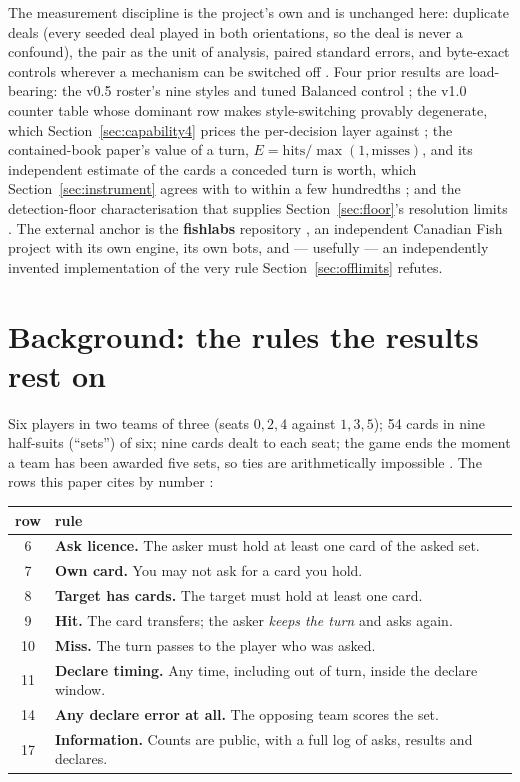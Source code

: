 \documentclass[11pt]{article}
\begin{document}
The measurement discipline is the project's own and is unchanged here: duplicate deals (every seeded
deal played in both orientations, so the deal is never a confound), the pair as the unit of
analysis, paired standard errors, and byte-exact controls wherever a mechanism can be switched off
\cite{v05paper,botlab}. Four prior results are load-bearing: the v0.5 roster's nine styles and tuned
Balanced control \cite{v05paper,styles}; the v1.0 counter table whose dominant row makes
style-switching provably degenerate, which Section~\ref{sec:capability4} prices the per-decision
layer against \cite{v10paper,v15paper,bounded}; the contained-book paper's value of a turn, $E =
\mathrm{hits}/\max(1,\mathrm{misses})$, and its independent estimate of the cards a conceded turn is
worth, which Section~\ref{sec:instrument} agrees with to within a few hundredths
\cite{containedpaper,containment}; and the detection-floor characterisation that supplies
Section~\ref{sec:floor}'s resolution limits \cite{floorpaper}. The external anchor is the
\textbf{fishlabs} repository \cite{fishlabs}, an independent Canadian Fish project with its own
engine, its own bots, and --- usefully --- an independently invented implementation of the very rule
Section~\ref{sec:offlimits} refutes.

\section{Background: the rules the results rest on}
\label{sec:background}

Six players in two teams of three (seats $0,2,4$ against $1,3,5$); 54 cards in nine half-suits
(``sets'') of six; nine cards dealt to each seat; the game ends the moment a team has been awarded
five sets, so ties are arithmetically impossible \cite{rules,pagat}. The rows this paper cites by
number \cite{rules}:

\begin{center}
\small
\begin{tabular}{@{}c p{}@{}}
\toprule
row & rule \\
\midrule
6  & \textbf{Ask licence.} The asker must hold at least one card of the asked set. \\
7  & \textbf{Own card.} You may not ask for a card you hold. \\
8  & \textbf{Target has cards.} The target must hold at least one card. \\
9  & \textbf{Hit.} The card transfers; the asker \emph{keeps the turn} and asks again. \\
10 & \textbf{Miss.} The turn passes to the player who was asked. \\
11 & \textbf{Declare timing.} Any time, including out of turn, inside the declare window. \\
14 & \textbf{Any declare error at all.} The opposing team scores the set. \\
17 & \textbf{Information.} Counts are public, with a full log of asks, results and declares. \\
\bottomrule
\end{tabular}
\end{center}
\end{document}
